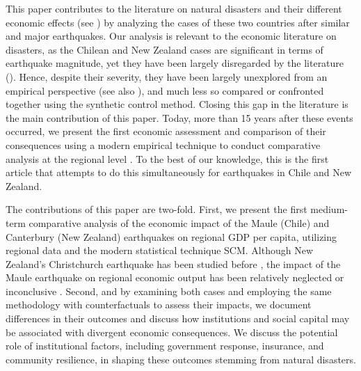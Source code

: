 \documentclass[12pt]{article}
\begin{document}
This paper contributes to the literature on natural disasters and their different economic effects (see \cite{barone2014natural, farzanegan2025bam, noydupont2018longterm, platt2016measuring, storr2016community}) by analyzing the cases of these two countries after similar and major earthquakes. Our analysis is relevant to the economic literature on disasters, as the Chilean and New Zealand cases are significant in terms of earthquake magnitude, yet they have been largely disregarded by the literature (\cite{cardenasjiron2012chilean, dussaillant2014trust, miller2013estimating}). Hence, despite their severity, they have been largely unexplored from an empirical perspective (see also \parencite{aguirre2023medium, nguyen2020insurance}), and much less so compared or confronted together using the synthetic control method. Closing this gap in the literature is the main contribution of this paper. Today, more than 15 years after these events occurred, we present the first economic assessment and comparison of their consequences using a modern empirical technique to conduct comparative analysis at the regional level \parencite{abadie2010synthetic, abadie2021jel, barone2014natural, dupont2015kobe}. To the best of our knowledge, this is the first article that attempts to do this simultaneously for earthquakes in Chile and New Zealand.     

The contributions of this paper are two-fold. First, we present the first medium-term comparative analysis of the economic impact of the Maule (Chile) and Canterbury (New Zealand) earthquakes on regional GDP per capita, utilizing regional data and the modern statistical technique SCM. Although New Zealand's Christchurch earthquake has been studied before \parencite{nguyen2020insurance, doyle2015short, miller2013estimating}, the impact of the Maule earthquake on regional economic output has been relatively neglected or inconclusive \parencite{aguirre2023medium, eclac2010overview}. Second, and by examining both cases and employing the same methodology with counterfactuals to assess their impacts, we document differences in their outcomes and discuss how institutions and social capital may be associated with divergent economic consequences. We discuss the potential role of institutional factors, including government response, insurance, and community resilience, in shaping these outcomes stemming from natural disasters.
\end{document}

